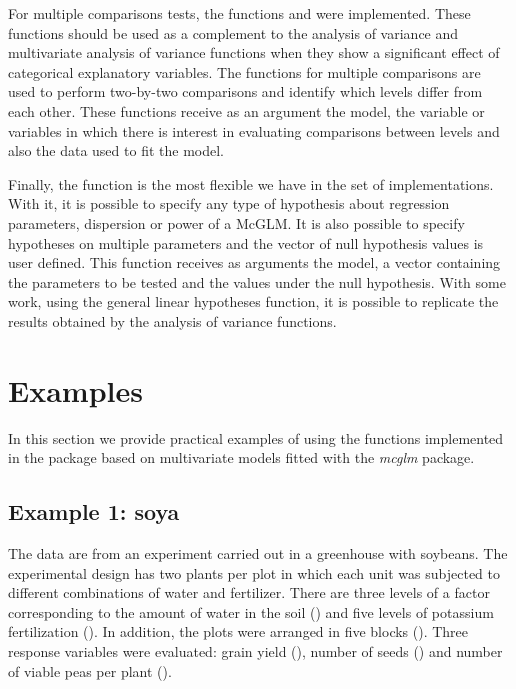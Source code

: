 \documentclass[article]{jss}\usepackage[]{graphicx}\usepackage[]{xcolor}
\begin{document}
For  multiple comparisons tests, the functions  and  were implemented. These functions should be used as a complement to the analysis of variance and multivariate analysis of variance functions when they show a significant effect of categorical explanatory variables. The functions for multiple comparisons are used to perform two-by-two comparisons and identify which levels differ from each other. These functions receive as an argument the model, the variable or variables in which there is interest in evaluating comparisons between levels and also the data used to fit the model.

Finally, the  function is the most flexible we have in the set of implementations. With it, it is possible to specify any type of hypothesis about regression parameters, dispersion or power of a McGLM. It is also possible to specify hypotheses on multiple parameters and the vector of null hypothesis values is user defined. This function receives as arguments the model, a vector containing the parameters to be tested and the values under the null hypothesis. With some work, using the general linear hypotheses function, it is possible to replicate the results obtained by the analysis of variance functions.


\section{Examples}\label{sec:exemplos}

In this section we provide practical examples of using the functions implemented in the  package based on multivariate models fitted with the \emph{mcglm} package.



\subsection{Example 1: soya}

The data are from an experiment carried out in a greenhouse with soybeans. The experimental design has two plants per plot in which each unit was subjected to different combinations of water and fertilizer. There are three levels of a factor corresponding to the amount of water in the soil () and five levels of potassium fertilization (). In addition, the plots were arranged in five blocks (). Three response variables were evaluated: grain yield (), number of seeds () and number of viable peas per plant ().
\end{document}
